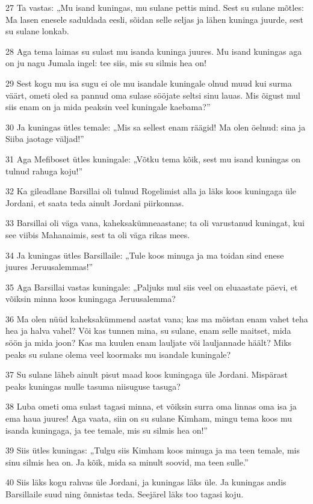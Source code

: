 \par 27 Ta vastas: „Mu isand kuningas, mu sulane pettis mind. Sest su sulane mõtles: Ma lasen enesele saduldada eesli, sõidan selle seljas ja lähen kuninga juurde, sest su sulane lonkab.
\par 28 Aga tema laimas su sulast mu isanda kuninga juures. Mu isand kuningas aga on ju nagu Jumala ingel: tee siis, mis su silmis hea on!
\par 29 Sest kogu mu isa sugu ei ole mu isandale kuningale olnud muud kui surma väärt, ometi oled sa pannud oma sulase sööjate seltsi sinu lauas. Mis õigust mul siis enam on ja mida peaksin veel kuningale kaebama?”
\par 30 Ja kuningas ütles temale: „Mis sa sellest enam räägid! Ma olen öelnud: sina ja Siiba jaotage väljad!”
\par 31 Aga Mefiboset ütles kuningale: „Võtku tema kõik, sest mu isand kuningas on tulnud rahuga koju!”
\par 32 Ka gileadlane Barsillai oli tulnud Rogelimist alla ja läks koos kuningaga üle Jordani, et saata teda ainult Jordani piirkonnas.
\par 33 Barsillai oli väga vana, kaheksakümneaastane; ta oli varustanud kuningat, kui see viibis Mahanaimis, sest ta oli väga rikas mees.
\par 34 Ja kuningas ütles Barsillaile: „Tule koos minuga ja ma toidan sind enese juures Jeruusalemmas!”
\par 35 Aga Barsillai vastas kuningale: „Paljuks mul siis veel on eluaastate päevi, et võiksin minna koos kuningaga Jeruusalemma?
\par 36 Ma olen nüüd kaheksakümmend aastat vana; kas ma mõistan enam vahet teha hea ja halva vahel? Või kas tunnen mina, su sulane, enam selle maitset, mida söön ja mida joon? Kas ma kuulen enam lauljate või lauljannade häält? Miks peaks su sulane olema veel koormaks mu isandale kuningale?
\par 37 Su sulane läheb ainult pisut maad koos kuningaga üle Jordani. Mispärast peaks kuningas mulle tasuma niisuguse tasuga?
\par 38 Luba ometi oma sulast tagasi minna, et võiksin surra oma linnas oma isa ja ema haua juures! Aga vaata, siin on su sulane Kimham, mingu tema koos mu isanda kuningaga, ja tee temale, mis su silmis hea on!”
\par 39 Siis ütles kuningas: „Tulgu siis Kimham koos minuga ja ma teen temale, mis sinu silmis hea on. Ja kõik, mida sa minult soovid, ma teen sulle.”
\par 40 Siis läks kogu rahvas üle Jordani, ja kuningas läks üle. Ja kuningas andis Barsillaile suud ning õnnistas teda. Seejärel läks too tagasi koju.
